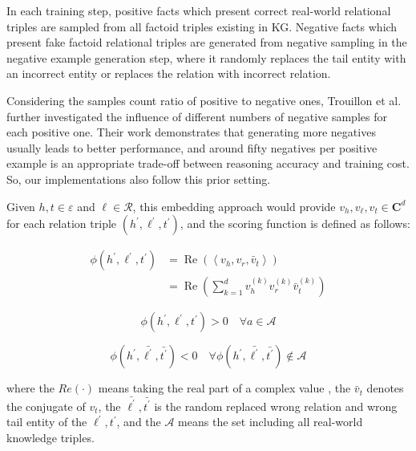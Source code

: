 \documentclass[pdflatex,sn-mathphys]{sn-jnl}%
\theoremstyle{thmstyleone}%
\theoremstyle{thmstyletwo}%
\theoremstyle{thmstylethree}%
\begin{document}
In each training step, positive facts which present correct real-world relational triples are sampled from all factoid triples existing in KG. Negative facts which present fake factoid relational triples are generated from negative sampling in the negative example generation step, where it randomly replaces the tail entity with an incorrect entity or replaces the relation with incorrect relation. 

Considering the samples count ratio of positive to negative ones, Trouillon et al. \cite{trouillon2016ComplEx} further investigated the influence of different numbers of negative samples for each positive one. Their work demonstrates that generating more negatives usually leads to better performance, and around fifty negatives per positive example is an appropriate trade-off between reasoning accuracy and training cost. So, our implementations also follow this prior setting.

Given $h, t \in \varepsilon$ and $\ell \in \mathcal{R}$, this embedding approach would provide $v_{h}, v_{\ell}, v_{t} \in \mathbf{C}^{d}$ for each relation triple $(h^{\prime}, \ell^{\prime}, t^{\prime})$, and the scoring function is defined as follows:

\begin{equation}
\label{equ_complex}
\begin{aligned}
\phi(h^{\prime}, \ell^{\prime}, t^{\prime}) &=\operatorname{Re}\left(\left\langle v_{h}, v_{r}, \bar{v}_{t}\right\rangle\right) \\
&=\operatorname{Re}\left(\sum_{k=1}^{d} v_{h}^{(k)} v_{r}^{(k)} \bar{v}_{t}^{(k)}\right)
\end{aligned}
\end{equation}

\begin{equation}
\label{filtering_equ1}
\phi\left(h^{\prime}, \ell^{\prime}, t^{\prime}\right)>0 \quad \forall a \in \mathcal{A}
\end{equation}

\begin{equation}
\label{filtering_equ2}
\phi\left(h^{\prime}, \bar{\ell^{\prime}}, \bar{t^{\prime}}\right)<0 \quad \forall \phi\left(h^{\prime}, \bar{\ell^{\prime}}, \bar{t^{\prime}}\right) \notin \mathcal{A}
\end{equation}

 where the $Re(\cdot)$ means taking the real part of a complex value , the $\bar{v}_{t}$ denotes the conjugate of ${v}_{t}$, the $\bar{\ell^{\prime}}, \bar{t^{\prime}}$ is the random replaced wrong relation and wrong tail entity of the $\ell^{\prime}, t^{\prime}$, and the $\mathcal{A}$ means the set including all real-world knowledge triples. 
 
\end{document}
